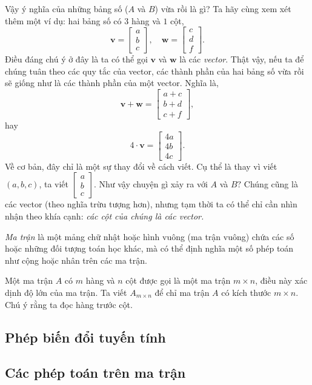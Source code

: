 Vậy ý nghĩa của những bảng số (\(A\) và \(B\)) vừa rồi là gì? Ta hãy cùng xem xét thêm một ví dụ: hai bảng số có \(3\) hàng và \(1\) cột, 
\[\mathbf{v}=\begin{bmatrix}
    a\\b\\c
\end{bmatrix}, \quad \mathbf{w}=\begin{bmatrix}
    c\\d\\f
\end{bmatrix}.
\] Điều đáng chú ý ở đây là ta có thể gọi \(\mathbf{v}\) và \(\mathbf{w}\) là các \emph{vector}. Thật vậy, nếu ta để chúng tuân theo các quy tắc của vector, các thành phần của hai bảng số vừa rồi sẽ giống như là các thành phần của một vector. 
Nghĩa là, \[\mathbf{v}+\mathbf{w}=\begin{bmatrix}
    a+c\\b+d\\c+f
\end{bmatrix},\] hay \[
    4\cdot\mathbf{v}=\begin{bmatrix}
        4a\\4b\\4c
\end{bmatrix}.\]
Về cơ bản, đây chỉ là một sự thay đổi về cách viết. Cụ thể là thay vì viết \((a,b,c)\), ta viết \(\begin{bmatrix}
    a\\b\\c
\end{bmatrix}\). Như vậy chuyện gì xảy ra với  \(A\) và \(B ?\) Chúng cũng là các vector (theo nghĩa trừu tượng hơn), nhưng tạm thời ta có thể chỉ cần nhìn nhận theo khía cạnh: \emph{các cột của chúng là các vector. }
\begin{definition}
    \emph{Ma trận} là một mảng chữ nhật hoặc hình vuông (ma trận vuông) chứa các số hoặc những đối tượng toán học khác, mà có thể định nghĩa một số phép toán như cộng hoặc nhân trên các ma trận.
\end{definition}
Một ma trận \(A\) có \(m\) hàng và \(n\) cột được gọi là một ma trận \(m\times n\), điều này xác dịnh độ lớn của ma trận. Ta viết \(A_{m\times n}\) để chỉ ma trận \(A\) có kích thước \(m\times n\). Chú ý rằng ta đọc hàng trước cột. 

\subsection{Phép biến đổi tuyến tính}

\subsection{Các phép toán trên ma trận}